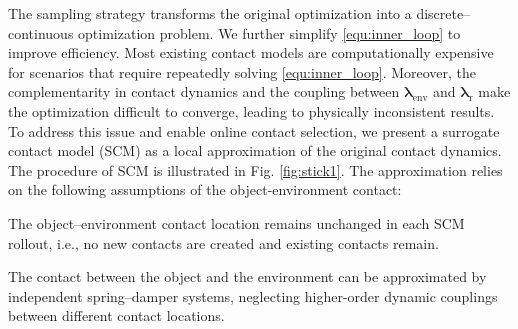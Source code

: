 The sampling strategy transforms the original optimization into a discrete–continuous optimization problem. We further simplify \eqref{equ:inner_loop} to improve efficiency. Most existing contact models are computationally expensive for scenarios that require repeatedly solving \eqref{equ:inner_loop}. Moreover, the complementarity in contact dynamics and the coupling between $\boldsymbol{\lambda}_{\text{env}}$ and $\boldsymbol{\lambda}_{\text{r}}$ make the optimization difficult to converge, leading to physically inconsistent results. To address this issue and enable online contact selection, we present a surrogate contact model (SCM) as a local approximation of the original contact dynamics. The procedure of SCM is illustrated in Fig. \ref{fig:stick1}. The approximation relies on the following assumptions of the object-environment contact:

\begin{assumption}
 The object--environment contact location remains unchanged in each SCM rollout, i.e., no new contacts are created and existing contacts remain.\label{assumption:mode}
\end{assumption}

\begin{assumption}
 The contact between the object and the environment can be approximated by independent spring–damper systems, neglecting higher-order dynamic couplings between different contact locations. \label{assumption:decoupling}
\end{assumption}

